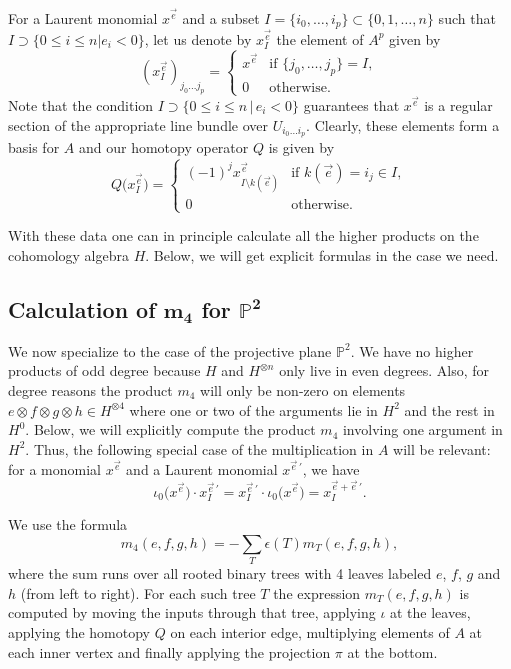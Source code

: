 \documentclass[pdftex]{sigma}
\numberwithin{equation}{section}
\renewcommand{\P}{{\mathbb P}}
\begin{document}
 For a Laurent monomial $x^{\vec{e}}$ and a subset
 $I=\{i_0,\dots ,i_p\}\subset \{0,1,\dots ,n\}$ such that $I\supset \{0\leq i\leq n|e_i<0\}$, let us denote
 by $x^{\vec{e}}_I$ the element of $A^p$ given by
 \[
 (x^{\vec{e}}_I)_{j_0\ldots j_p}=\begin{cases}
	x^{\vec{e}} & \text{if } \{j_0,\dots ,j_p\}=I,\\ 0 &\text{otherwise}.\end{cases}
\]
	Note that the condition $I\supset \{0\leq i\leq n \, |\, e_i<0\}$ guarantees that $x^{\vec{e}}$ is a regular section of the appropriate line bundle over $U_{i_0\ldots i_p}$.
	Clearly, these elements form a basis for $A$ and our homotopy operator $Q$ is given by
	\[
Q\big(x^{\vec{e}}_I\big)=\begin{cases}
		(-1)^jx^{\vec{e}}_{I\setminus k(\vec{e})} & \text{if }k(\vec{e})=i_j\in I,\\
		0 & \text{otherwise}.
	\end{cases}
\]

With these data one can in principle calculate all the higher products on the cohomology algebra $H$. Below, we will get explicit formulas in the case we need.

\subsection[Calculation of m\_4 for P\^{}2]{Calculation of $\boldsymbol{m_4}$ for $\boldsymbol{\P^2}$}\label{m4-P2-calc-sec}

We now specialize to the case of the projective plane $\mathbb{P}^2$. We have no higher products of odd degree because $H$ and $H^{\otimes n}$ only live in even degrees.
Also, for degree reasons the product $m_4$ will only be non-zero on elements $e\otimes f\otimes g\otimes h\in H^{\otimes 4}$ where one or two of the arguments lie in $H^2$ and the rest in $H^0$. Below, we will explicitly compute the product $m_4$ involving one argument in $H^2$.
Thus, the following special case of the multiplication in $A$ will be relevant: for a monomial $x^{\vec{e}}$ and a Laurent monomial $x^{\vec{e}\,'}$, we have
\[
\iota_0\big(x^{\vec{e}}\big)\cdot x^{\vec{e}\,'}_I=x^{\vec{e}\,'}_I\cdot \iota_0\big(x^{\vec{e}}\big)=x^{\vec{e}+\vec{e}\,'}_I.
\]

We use the formula
\[
m_4(e,f,g,h)=-\sum_{T}\epsilon(T)m_T(e,f,g,h),
\]
where the sum runs over all rooted binary trees with 4 leaves labeled $e$, $f$, $g$ and $h$ (from left to right). For each such tree $T$ the expression $m_T(e,f,g,h)$ is computed by moving the inputs through that tree, applying $\iota$ at the leaves, applying the homotopy $Q$ on each interior edge, multiplying elements of $A$ at each inner vertex and finally applying the projection $\pi$ at the bottom.
\end{document}
